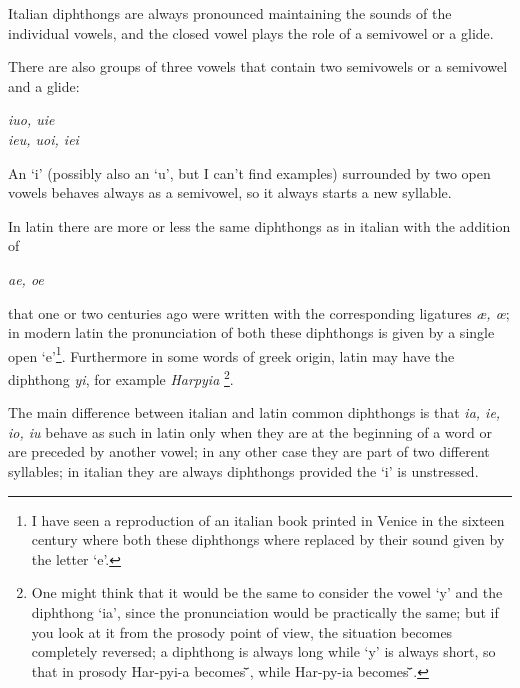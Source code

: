 \documentclass{ltugboat}
\begin{document}
Italian  diphthongs  are  always  pronounced  maintaining  the sounds of the
individual vowels, and the closed vowel plays the role of a semivowel  or  a
glide.

There  are  also  groups  of  three  vowels that contain two semivowels or a
semivowel and a glide:
 \begin{center}\it
iuo, uie \\
ieu, uoi, iei
\end{center}

An  `i'  (possibly also an `u', but I can't find examples) surrounded by two
open vowels behaves always as  a  semivowel,  so  it  always  starts  a  new
syllable.

 In latin there are more or less the same diphthongs as
in italian with the addition of
\begin{center}\it  
ae,  oe  
\end{center} 
that  one or two centuries ago were written with the corresponding ligatures
{\it \ae, \oe}; in modern latin the pronunciation of both  these  diphthongs
is  given  by  a  single  open `e'\footnote{I have seen a reproduction of an
italian book printed in Venice in  the  sixteen  century  where  both  these
diphthongs  where  replaced  by  their  sound  given  by  the  letter `e'.}.
Furthermore in some words of greek origin, latin may have the diphthong {\it
yi}, for example {\it Harpyia} \cite{manna}\footnote{One might think that it
would be the same to consider the vowel `y' and the  diphthong  `ia',  since
the  pronunciation would be practically the same; but if you look at it from
the prosody point of view, the  situation  becomes  completely  reversed;  a
diphthong  is  always  long  while  `y'  is always short, so that in prosody
Har-pyi-a becomes \={}\={}\u{}, while Har-py-ia becomes \={}\u{}\={}.}.

The main difference between italian and latin common diphthongs is that {\it
ia, ie, io, iu} behave as such in latin only when they are at the  beginning
of  a word or are preceded by another vowel; in any other case they are part
of two different syllables; in italian they are always diphthongs provided 
the `i' is unstressed.
\end{document}
